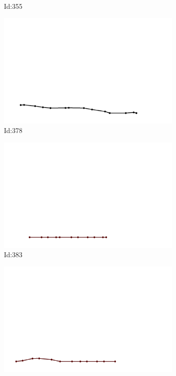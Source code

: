 \documentclass[12pt,twoside]{report}
\begin{document}
\begin{figure}
\begin{subfigure}[b]{0.20\textwidth}
\caption{Id:355}
\end{subfigure}
\begin{subfigure}[b]{0.20\textwidth}
\centering
\includegraphics[width=\textwidth]{../trajectories/378.png}
\caption{Id:378}
\end{subfigure}
\begin{subfigure}[b]{0.20\textwidth}
\centering
\includegraphics[width=\textwidth]{../trajectories/383.png}
\caption{Id:383}
\end{subfigure}
\begin{subfigure}[b]{0.20\textwidth}
\centering
\includegraphics[width=\textwidth]{../trajectories/390.png}

\end{subfigure}
\end{figure}
\end{document}
